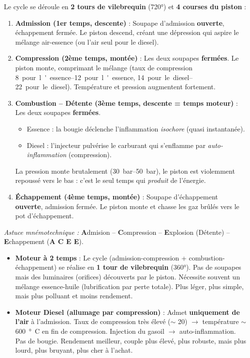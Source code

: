 \documentclass[11pt]{article}
\newcommand{\cle}[1]{{\popxbold\color{popdark}#1}}
\begin{document}
\begin{methode}
Le cycle se déroule en \textbf{2 tours de vilebrequin} (720°) et \textbf{4 courses du piston} :
\begin{enumerate}
\item \textbf{Admission (1er temps, descente)} : Soupape d'admission \textbf{ouverte}, échappement fermée. Le piston descend, créant une dépression qui aspire le mélange air-essence (ou l'air seul pour le diesel).
\item \textbf{Compression (2ème temps, montée)} : Les deux soupapes \textbf{fermées}. Le piston monte, comprimant le mélange (taux de compression \SIrange{8}{12}{ pour l'essence}, \SIrange{14}{22}{ pour le diesel}). Température et pression augmentent fortement.
\item \textbf{Combustion -- Détente (3ème temps, descente = \cle{temps moteur})} : Les deux soupapes \textbf{fermées}. 
\begin{itemize}
\item Essence : la bougie déclenche l'inflammation \emph{isochore} (quasi instantanée).
\item Diesel : l'injecteur pulvérise le carburant qui s'enflamme par \emph{auto-inflammation} (compression).
\end{itemize}
La pression monte brutalement (\SIrange{30}{50}{bar}), le piston est violemment repoussé vers le bas : c'est le seul temps qui \emph{produit} de l'énergie.
\item \textbf{Échappement (4ème temps, montée)} : Soupape d'échappement \textbf{ouverte}, admission fermée. Le piston monte et chasse les gaz brûlés vers le pot d'échappement.
\end{enumerate}
\emph{Astuce mnémotechnique :} \textbf{A}dmision -- \textbf{C}ompression -- \textbf{E}xplosion (Détente) -- \textbf{E}chappement (\textbf{A C E E}).
\end{methode}

\begin{propriete}
\begin{itemize}
\item \textbf{Moteur à 2 temps} : Le cycle (admission-compression + combustion-échappement) se réalise en \textbf{1 tour de vilebrequin} (360°). Pas de soupapes mais des \cle{luminaires} (orifices) découverts par le piston. Nécessite souvent un \cle{mélange essence-huile} (lubrification par perte totale). Plus léger, plus simple, mais plus polluant et moins rendement.
\item \textbf{Moteur Diesel (allumage par compression)} : Admet \textbf{uniquement de l'air} à l'admission. Taux de compression très élevé ($\sim$ 20) $\rightarrow$ température $\sim$ \SI{600}{°C} en fin de compression. Injection du gasoil $\rightarrow$ auto-inflammation. Pas de bougie. Rendement meilleur, couple plus élevé, plus robuste, mais plus lourd, plus bruyant, plus cher à l'achat.
\end{itemize}
\end{propriete}
\end{document}
